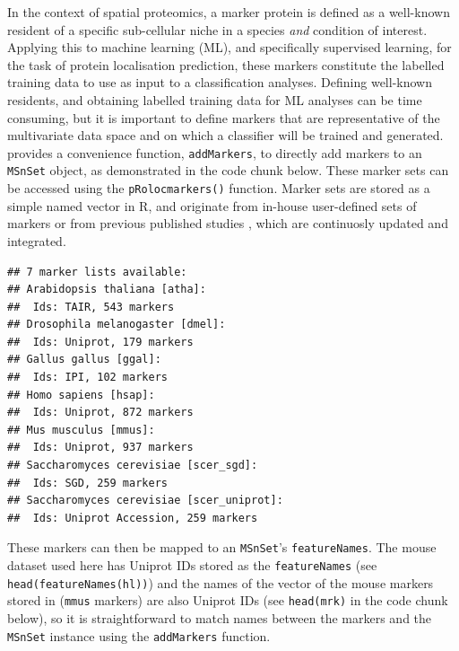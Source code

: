 In the context of spatial proteomics, a marker protein is defined as a
well-known resident of a specific sub-cellular niche in a species
\textit{and} condition of interest. Applying this to machine learning
(ML), and specifically supervised learning, for the task of protein
localisation prediction, these markers constitute the labelled
training data to use as input to a classification analyses. Defining
well-known residents, and obtaining labelled training data for ML
analyses can be time consuming, but it is important to define markers
that are representative of the multivariate data space and on which a
classifier will be trained and generated.  provides a
convenience function, \texttt{addMarkers}, to directly add markers to
an \texttt{MSnSet} object, as demonstrated in the code chunk
below. These marker sets can be accessed using the
\texttt{pRolocmarkers()} function. Marker sets are stored as a simple
named vector in R, and originate from in-house user-defined sets of
markers or from previous published studies \cite{Gatto:2014b}, which
are continuosly updated and integrated.

\begin{knitrout}
\color{fgcolor}\begin{kframe}
\begin{alltt}
\hlstd{()}
\end{alltt}
\begin{verbatim}
## 7 marker lists available:
## Arabidopsis thaliana [atha]:
##  Ids: TAIR, 543 markers
## Drosophila melanogaster [dmel]:
##  Ids: Uniprot, 179 markers
## Gallus gallus [ggal]:
##  Ids: IPI, 102 markers
## Homo sapiens [hsap]:
##  Ids: Uniprot, 872 markers
## Mus musculus [mmus]:
##  Ids: Uniprot, 937 markers
## Saccharomyces cerevisiae [scer_sgd]:
##  Ids: SGD, 259 markers
## Saccharomyces cerevisiae [scer_uniprot]:
##  Ids: Uniprot Accession, 259 markers
\end{verbatim}
\end{kframe}
\end{knitrout}

These markers can then be mapped to an \texttt{MSnSet}'s
\texttt{featureNames}. The mouse dataset used here has Uniprot IDs
stored as the \texttt{featureNames} (see
\texttt{head(featureNames(hl))}) and the names of the vector of the
mouse markers stored in  (\texttt{mmus} markers) are
also Uniprot IDs (see \texttt{head(mrk)} in the code chunk below), so
it is straightforward to match names between the markers and the
\texttt{MSnSet} instance using the \texttt{addMarkers} function. 

